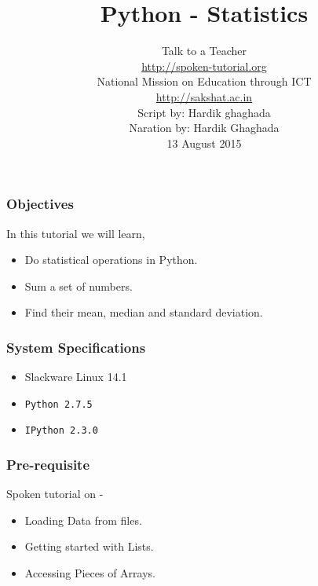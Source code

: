 \documentclass[17pt,compress]{beamer}
\author[FOSSEE]{}
\institute[IIT Bombay]{}
\date[]{}
\begin{document}
\sffamily \bfseries
\title
[Statistics]
{Python - Statistics}
\author
[FOSSEE, IIT - Bombay]
{\small Talk to a Teacher\\{\color{blue}\url{http://spoken-tutorial.org}}\\National Mission on Education
 through ICT\\{\color{blue}\url{http://sakshat.ac.in}} \\[0.5cm]{\tiny Script by: Hardik ghaghada \\ Naration by: Hardik Ghaghada \\ 13 August 2015}}

\begin{frame}
   \titlepage
\end{frame}
\begin{frame}
\frametitle{Objectives}
\label{sec-2}

  In this tutorial we will learn, \pause
   

\begin{itemize}
\item Do statistical operations in Python.\pause
\item Sum a set of numbers.\pause
\item Find their mean, median and standard deviation.
\end{itemize}
\end{frame}
\begin{frame}
\frametitle{System Specifications}\pause
\begin{itemize}
\item Slackware Linux 14.1\pause
\item \texttt{Python 2.7.5} \pause
\item \texttt{IPython 2.3.0}
\end{itemize}
\end{frame}
\begin{frame}
\frametitle{Pre-requisite}
\label{sec-3}

  Spoken tutorial on -\pause

\begin{itemize}
\item Loading Data from files.\pause
\item Getting started with Lists.\pause
\item Accessing Pieces of Arrays.
\end{itemize}
\end{frame}
\end{document}
